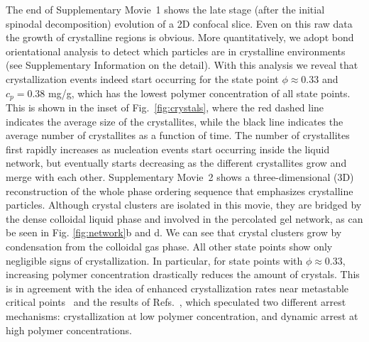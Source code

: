\documentclass[preprint,amsmath,amssymb,superscriptaddress]{revtex4-1}
\begin{document}
The end of Supplementary Movie~1 shows the late stage (after the initial spinodal decomposition) evolution of a 2D confocal slice. Even on this raw data the growth of crystalline regions is obvious. More quantitatively, we adopt bond orientational analysis to detect which particles are in crystalline environments~\cite{russo2013interplay} 
(see Supplementary Information on the detail). 
With this analysis we reveal that crystallization events indeed start occurring for the state point $\phi\approx 0.33$ and $c_p=0.38$ mg/g, which has the lowest
polymer concentration of all state points. This is shown in the inset of Fig.~\ref{fig:crystals}, where the red dashed line indicates the average size of the crystallites, 
while the black line indicates the average number of crystallites as a function of time. The number of crystallites first rapidly increases as nucleation events
start occurring inside the liquid network, but eventually starts decreasing as the different crystallites grow and merge with each other.  Supplementary Movie~2 shows a three-dimensional (3D) reconstruction  of the whole phase ordering sequence that emphasizes crystalline particles. Although crystal clusters are isolated in this movie, they are bridged by the dense colloidal liquid phase and involved in the percolated gel network, as can be seen in Fig. \ref{fig:network}b and d. 
We can see that crystal clusters grow by condensation from the colloidal gas phase. 
All other state points show only negligible signs of crystallization. In particular, for state points with $\phi\approx 0.33$, increasing
polymer concentration drastically reduces the amount of crystals. This is in agreement with the
idea of enhanced crystallization rates near metastable critical points~\cite{ten1997enhancement,olmsted1998spinodal} and the
results of Refs.~\cite{soga1999metastable,fortini2008crystallization,perez2011pathways},
which speculated two different arrest mechanisms: crystallization at low polymer concentration, and dynamic arrest at high polymer concentrations.
\end{document}
